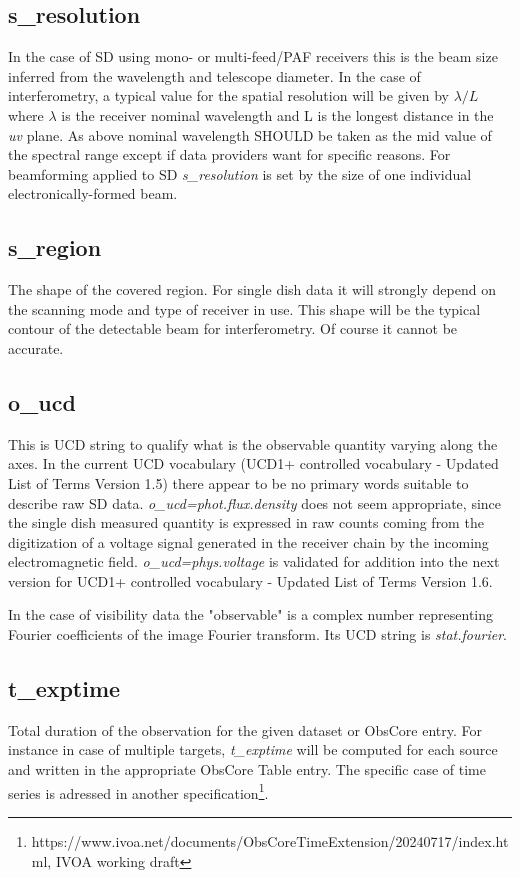 \documentclass[11pt,a4paper]{ivoa}
\begin{document}
\subsection{s\_resolution}
\label{sec:res}
In the case of SD using mono- or multi-feed/PAF receivers this is the beam size inferred from the wavelength and telescope diameter.
In the case of interferometry, a typical value for the spatial resolution will be given by $\lambda / L$ where $\lambda$
is the %
receiver nominal wavelength and L is the longest distance in the \emph{uv} plane.
As above nominal wavelength SHOULD be taken as the mid value of the spectral range except if data providers want  
for specific reasons. 
For beamforming applied to SD \emph{s\_resolution} is set by the size of one individual electronically-formed beam.
 
\subsection{s\_region}
The shape of the covered region. 
For single dish data it will strongly depend on the scanning mode and type of receiver in use.
This shape will be the typical contour of the detectable beam for interferometry. Of course it cannot be accurate.

\subsection{o\_ucd}
This is UCD string  to qualify what is the observable quantity varying along the axes. 
In the current UCD vocabulary (UCD1+ controlled vocabulary - Updated List of Terms Version 1.5) there appear to be no primary words suitable to describe raw SD data. \emph{o\_ucd=phot.flux.density} does not seem appropriate, since the single dish measured quantity is expressed in raw counts coming from the digitization of a voltage signal generated in the receiver chain by the incoming electromagnetic field. 
\emph{o\_ucd=phys.voltage} is validated for addition into the next version for UCD1+ controlled vocabulary - Updated List of Terms Version 1.6.

In the case of visibility data the "observable" is a complex number representing Fourier
coefficients of the image Fourier transform. Its UCD string is \emph{stat.fourier}.

\subsection{t\_exptime}
Total duration of the observation for the given dataset or ObsCore entry. For instance  in case of multiple targets, \emph{t\_exptime}
will be computed for each source and written in the appropriate ObsCore Table entry. The specific case of time series is adressed in another
specification\footnote{https://www.ivoa.net/documents/ObsCoreTimeExtension/20240717/index.html, IVOA working draft}.
\end{document}
